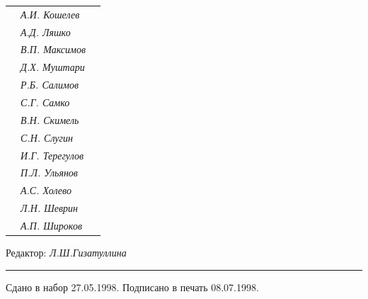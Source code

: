 \begin{tabular}{p{63mm}p{40mm}p{50mm}}
                               &   \it А.И. Кошелев  & \\


                               &   \it А.Д. Ляшко  & \\


                               &   \it В.П. Максимов  & \\


                               &   \it Д.Х. Муштари & \\


                               &   \it Р.Б. Салимов  & \\


                               &   \it С.Г. Самко  & \\


                               &   \it В.Н. Скимель &  \\


                               &   \it С.Н. Слугин  & \\


                               &   \it И.Г. Терегулов  & \\


                               &   \it П.Л. Ульянов  & \\


                               &   \it А.С. Холево  & \\


                               &   \it Л.Н. Шеврин  & \\


                               &   \it А.П. Широков & \\


\end{tabular} 


\bigskip 


\bigskip 


\bigskip 





 


\centerline{Редактор: \it Л.Ш.Гизатуллина}


\bigskip 


\hrule 


\setlength{\hoffset}{-23mm}


\bigskip


\noindent Сдано в набор 27.05.1998. Подписано в печать 08.07.1998.


